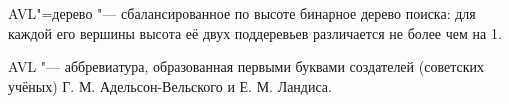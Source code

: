 AVL"=дерево "--- сбалансированное по высоте бинарное дерево поиска: для каждой его вершины высота её двух поддеревьев различается не более чем на 1.

AVL "--- аббревиатура, образованная первыми буквами создателей (советских учёных) Г. М. Адельсон-Вельского и Е. М. Ландиса.